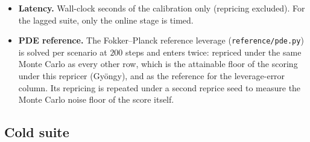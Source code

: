 \documentclass[11pt,a4paper]{article}
\newcommand{\code}[1]{\texttt{#1}}
\begin{document}
\begin{itemize}
\item \textbf{Latency.} Wall-clock seconds of the calibration only (repricing excluded). For the lagged suite, only the online stage is timed.
\item \textbf{PDE reference.} The Fokker--Planck reference leverage (\code{reference/pde.py}) is solved per scenario at $200$ steps and enters twice: repriced under the same Monte Carlo as every other row, which is the attainable floor of the scoring under this repricer (Gy\"ongy), and as the reference for the leverage-error column. Its repricing is repeated under a second reprice seed to measure the Monte Carlo noise floor of the score itself.
\end{itemize}

\subsection{Cold suite}\label{sec:suite-cold}
\end{document}
